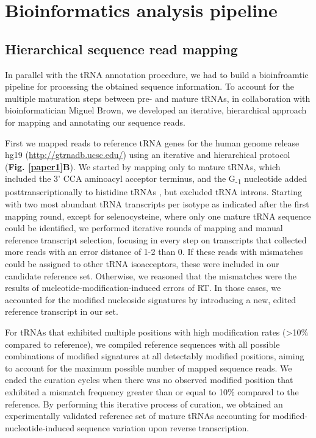 \documentclass[12pt]{rockefeller}
\newcommand{\sub}[1]{\textsubscript{#1}}
\begin{document}
\section{Bioinformatics analysis pipeline}
\subsection{Hierarchical sequence read mapping}
In parallel with the tRNA annotation procedure, we had to build a bioinfroamtic pipeline for processing the obtained sequence information. To account for the multiple maturation steps between pre- and mature tRNAs, in collaboration with bioinformatician Miguel Brown, we developed an iterative, hierarchical approach for mapping and annotating our sequence reads. 

First we mapped reads to reference tRNA genes for the human genome release hg19 (\url{http://gtrnadb.ucsc.edu/}) using an iterative and hierarchical protocol (\textbf{Fig. \ref{paper1}B}). We started by mapping only to mature tRNAs, which included the 3’ CCA aminoacyl acceptor terminus, and the G\sub{-1} nucleotide added posttranscriptionally to histidine tRNAs \cite{Gu:2003jj, Juhling:2009ip}, but excluded tRNA introns. Starting with two most abundant tRNA transcripts per \gls{isotype}  as indicated after the first mapping round, except for selenocysteine, where only one mature tRNA sequence could be identified, we performed iterative rounds of mapping and manual reference transcript selection, focusing in every step on transcripts that collected more reads with an error distance of 1-2 than 0. If these reads with mismatches could be assigned to other tRNA isoacceptors, these were included in our candidate reference set. Otherwise, we reasoned that the mismatches were the results of nucleotide-modification-induced errors of RT. In those cases, we accounted for the modified nucleoside signatures by introducing a new, edited reference transcript in our set. 

For tRNAs that exhibited multiple positions with high modification rates (>10\% compared to reference), we compiled reference sequences with all possible combinations of modified signatures at all detectably modified positions, aiming to account for the maximum possible number of mapped sequence reads. We ended the curation cycles when there was no observed modified position that exhibited a mismatch frequency greater than or equal to 10\% compared to the reference. By performing this iterative process of curation, we obtained an experimentally validated reference set of mature tRNAs accounting for modified-nucleotide-induced sequence variation upon reverse transcription.
\end{document}
